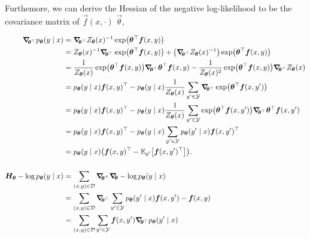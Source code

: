 Furthemore, we can derive the Hessian of the negative log-likelihood to be the
covariance matrix of $\vec{f}(x,\cdot)$ \wrt $\vec{\theta}$,

\begin{align*}
  \grad{p_{\vec{\theta}}(y\mid x)}{\transpose{\vec{\theta}}} &= \grad{Z_{\vec{\theta}}(x)^{-1} \exp \lft( \transpose{\vec{\theta}} \vec{f}(x,y) \rgt)}{\transpose{\vec{\theta}}} \\
  &= Z_{\vec{\theta}}(x)^{-1} \grad{\exp \lft( \transpose{\vec{\theta}} \vec{f}(x,y) \rgt)}{\transpose{\vec{\theta}}} + \lft( \grad{Z_{\vec{\theta}}(x)^{-1}}{\transpose{\vec{\theta}}} \rgt) \exp \lft( \transpose{\vec{\theta}} \vec{f}(x,y) \rgt) \\
  &= \frac{1}{Z_{\vec{\theta}}(x)} \exp \lft( \transpose{\vec{\theta}} \vec{f}(x,y) \rgt) \grad{\transpose{\vec{\theta}} \vec{f}(x,y)}{\transpose{\vec{\theta}}} - \frac{1}{Z_{\vec{\theta}}(x)^2} \exp \lft( \transpose{\vec{\theta}} \vec{f}(x,y) \rgt) \grad{Z_{\vec{\theta}}(x)}{\transpose{\vec{\theta}}} \\
  &= p_{\vec{\theta}}(y\mid x) \transpose{\vec{f}(x,y)} - p_{\vec{\theta}}(y\mid x) \frac{1}{Z_{\vec{\theta}}(x)} \sum_{y'\in\mathcal{Y}} \grad{\exp \lft( \transpose{\vec{\theta}} \vec{f}(x,y') \rgt)}{\transpose{\vec{\theta}}} \\
  &= p_{\vec{\theta}}(y\mid x) \transpose{\vec{f}(x,y)} - p_{\vec{\theta}}(y\mid x) \frac{1}{Z_{\vec{\theta}}(x)} \sum_{y'\in\mathcal{Y}} \exp \lft( \transpose{\vec{\theta}} \vec{f}(x,y') \rgt) \grad{\transpose{\vec{\theta}} \vec{f}(x,y')}{\transpose{\vec{\theta}}} \\
  &= p_{\vec{\theta}}(y\mid x) \transpose{\vec{f}(x,y)} - p_{\vec{\theta}}(y\mid x) \sum_{y'\in\mathcal{Y}} p_{\vec{\theta}}(y'\mid x) \transpose{\vec{f}(x,y')} \\
  &= p_{\vec{\theta}}(y\mid x) \lft( \transpose{\vec{f}(x,y)} - \E_{y'} \lft[ \transpose{\vec{f}(x,y')} \rgt] \rgt). \\
  \\
  \hess{-\log p_{\vec{\theta}}(y\mid x)}{\vec{\theta}} &= \sum_{(x,y)\in\mathcal{D}} \grad{ \grad{-\log p_{\vec{\theta}}(y\mid x)}{\vec{\theta}} }{\transpose{\vec{\theta}}} \\
  &= \sum_{(x,y)\in\mathcal{D}} \grad{\sum_{y'\in\mathcal{Y}} p_{\vec{\theta}}(y'\mid x) \vec{f}(x,y') - \vec{f}(x,y)}{\transpose{\vec{\theta}}} \\
  &= \sum_{(x,y)\in\mathcal{D}} \sum_{y'\in\mathcal{Y}} \vec{f}(x,y') \grad{p_{\vec{\theta}}(y'\mid x)}{\transpose{\vec{\theta}}} \\

\end{align*}
